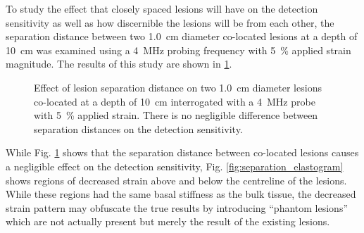 			To study the effect that closely spaced lesions will have on the detection sensitivity as well as how discernible the lesions will be from each other, the separation distance between two \SI{1.0}{cm} diameter co-located lesions at a depth of \SI{10}{cm} was examined using a \SI{4}{MHz} probing frequency with \SI{5}{\percent} applied strain magnitude. The results of this study are shown in \ref{fig:separation_characterization}.

			\begin{figure}[!t]
				\centering
				\caption[Co-located lesion separation distance characterization]{Effect of lesion separation distance on two \SI{1.0}{cm} diameter lesions co-located at a depth of \SI{10}{cm} interrogated with a \SI{4}{MHz} probe with \SI{5}{\percent} applied strain. There is no negligible difference between separation distances on the detection sensitivity.}
				\label{fig:separation_characterization}
			\end{figure}

			While Fig. \ref{fig:separation_characterization} shows that the separation distance between co-located lesions causes a negligible effect on the detection sensitivity, Fig. \ref{fig:separation_elastogram} shows regions of decreased strain above and below the centreline of the lesions. While these regions had the same basal stiffness as the bulk tissue, the decreased strain pattern may obfuscate the true results by introducing ``phantom lesions'' which are not actually present but merely the result of the existing lesions.


